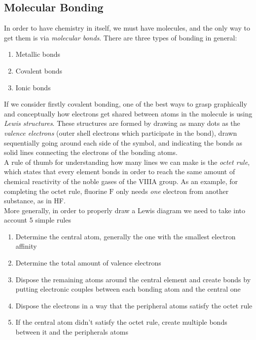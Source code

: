 \documentclass[../qm.tex]{subfiles}
\begin{document}
\subsection{Molecular Bonding}
In order to have chemistry in itself, we must have molecules, and the only way to get them is via \textit{molecular bonds}. There are three types of bonding in general:
\begin{enumerate}
\item Metallic bonds
\item Covalent bonds
\item Ionic bonds
\end{enumerate}
\begin{dfn}
	If we consider firstly covalent bonding, one of the best ways to grasp graphically and conceptually how electrons get shared between atoms in the molecule is using \emph{Lewis structures}. These structures are formed by drawing as many dots as the \textit{valence electrons} (outer shell electrons which participate in the bond), drawn sequentially going around each side of the symbol, and indicating the bonds as solid lines connecting the electrons of the bonding atoms.\\
	A rule of thumb for understanding how many lines we can make is the \emph{octet rule}, which states that every element bonds in order to reach the same amount of chemical reactivity of the noble gases of the VIIIA group. As an example, for completing the octet rule, fluorine $\mathrm{F}$ only needs \textit{one} electron from another substance, as in HF.\\
	More generally, in order to properly draw a Lewis diagram we need to take into account 5 simple rules
	\begin{enumerate}
	\item Determine the central atom, generally the one with the smallest electron affinity
	\item Determine the total amount of valence electrons
	\item Dispose the remaining atoms around the central element and create bonds by putting electronic couples between each bonding atom and the central one
	\item Dispose the electrons in a way that the peripheral atoms satisfy the octet rule
	\item If the central atom didn't satisfy the octet rule, create multiple bonds between it and the peripherals atoms
	\end{enumerate}
\end{dfn}
\end{document}
